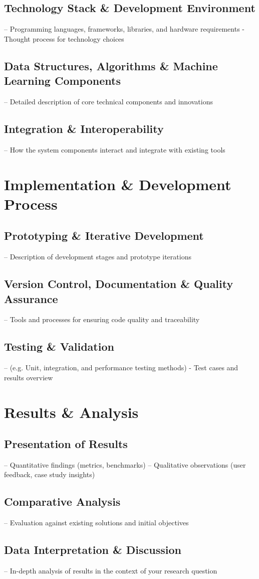 \subsection{Technology Stack \& Development Environment}
– Programming languages, frameworks, libraries, and hardware requirements
- Thought process for technology choices
\subsection{Data Structures, Algorithms \& Machine Learning Components}
– Detailed description of core technical components and innovations
\subsection{Integration \& Interoperability}
– How the system components interact and integrate with existing tools
\section{Implementation \& Development Process}
\subsection{Prototyping \& Iterative Development}
– Description of development stages and prototype iterations
\subsection{Version Control, Documentation \& Quality Assurance}
– Tools and processes for ensuring code quality and traceability
\subsection{Testing \& Validation}
– (e.g. Unit, integration, and performance testing methods)
- Test cases and results overview
\section{Results \& Analysis}
\subsection{Presentation of Results}
– Quantitative findings (metrics, benchmarks)
– Qualitative observations (user feedback, case study insights)
\subsection{Comparative Analysis}
– Evaluation against existing solutions and initial objectives
\subsection{Data Interpretation \& Discussion}
– In-depth analysis of results in the context of your research question